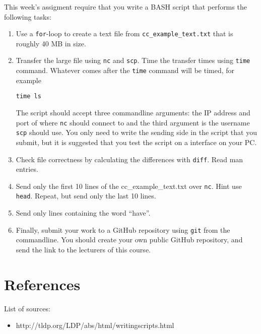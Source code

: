 \documentclass[a4paper]{article}
\begin{document}
This week's assigment require that you write a BASH script that performs the following tasks: 

\begin{enumerate}
\item Use a \texttt{for}-loop to create a text file from \texttt{cc\_example\_text.txt} that is roughly 40 MB in size. 

\item{Transfer the large file using \texttt{nc} and \texttt{scp}. Time the transfer times using \texttt{time} command. Whatever comes after the \texttt{time} command will be timed, for example 
\begin{lstlisting}
time ls
\end{lstlisting}
The script should accept three commandline arguments: the IP address and port of where \texttt{nc} should connect to and the third argument is the username \texttt{scp} should use. You only need to write the sending side in the script that you submit, but it is suggested that you test the script on a interface on your PC. 
}

\item Check file correctness by calculating the differences with \texttt{diff}. Read man entries.

\item Send only the first 10 lines of the cc\_example\_text.txt over \texttt{nc}. Hint use \texttt{head}. Repeat, but send only the last 10 lines. 
\item Send only lines containing the word ``have''. 

\item Finally, submit your work to a GitHub repository using \texttt{git} from the commandline. You should create your own public GitHub repository, and send the link to the lecturers of this course. 

\end{enumerate} 

\section{References}

List of sources:

\begin{itemize}
	
    \item http://tldp.org/LDP/abs/html/writingscripts.html
    
\end{itemize}
\end{document}
